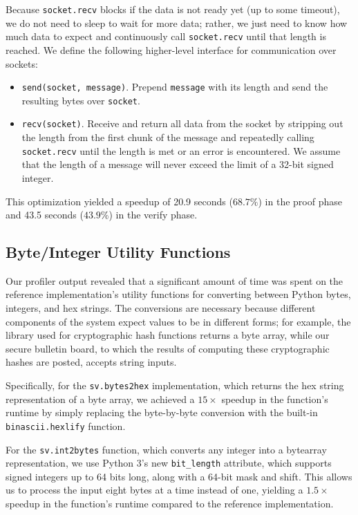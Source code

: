 Because \texttt{socket.recv} blocks if the data is not ready yet (up to some timeout), we do not need to sleep to wait for more data; rather, we just need to know how much data to expect and continuously call \texttt{socket.recv} until that length is reached. We define the following higher-level interface for communication over sockets:
\begin{itemize}
\item \texttt{send(socket, message)}. Prepend \texttt{message} with its length and send the resulting bytes over \texttt{socket}.
\item \texttt{recv(socket)}. Receive and return all data from the socket by stripping out the length from the first chunk of the message and repeatedly calling \texttt{socket.recv} until the length is met or an error is encountered. We assume that the length of a message will never exceed the limit of a 32-bit signed integer.
\end{itemize}

This optimization yielded a speedup of 20.9 seconds ($68.7\%$) in the proof phase and 43.5 seconds ($43.9\%$) in the verify phase.

\subsection{Byte/Integer Utility Functions}

Our profiler output revealed that a significant amount of time was spent on the reference implementation's utility functions for converting between Python bytes, integers, and hex strings. The conversions are necessary because different components of the system expect values to be in different forms; for example, the library used for cryptographic hash functions returns a byte array, while our secure bulletin board, to which the results of computing these cryptographic hashes are posted, accepts string inputs.

Specifically, for the \texttt{sv.bytes2hex} implementation, which returns the hex string representation of a byte array, we achieved a $15 \times$ speedup in the function's runtime by simply replacing the byte-by-byte conversion with the built-in \texttt{binascii.hexlify} function.

For the \texttt{sv.int2bytes} function, which converts any integer into a bytearray representation, we use Python 3's new \texttt{bit\_length} attribute, which supports signed integers up to 64 bits long, along with a 64-bit mask and shift. This allows us to process the input eight bytes at a time instead of one, yielding a $1.5 \times$ speedup in the function's runtime compared to the reference implementation.

